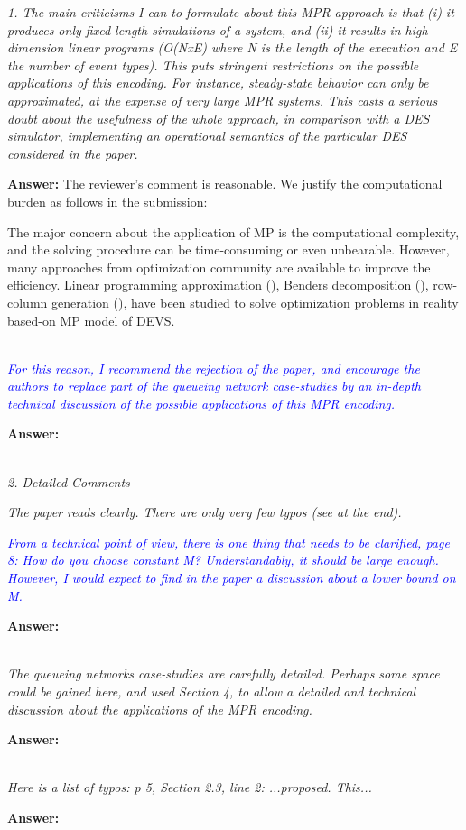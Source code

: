 \documentclass[suppldata]{interact}
\begin{document}
\textit{1. The main criticisms I can to formulate about this MPR approach is that
(i) it produces only fixed-length simulations of a system, and (ii) it
results in high-dimension linear programs (O(NxE) where N is the
length of the execution and E the number of event types). This puts
stringent restrictions on the possible applications of this
encoding. For instance, steady-state behavior can only be
approximated, at the expense of very large MPR systems. This casts a
serious doubt about the usefulness of the whole approach, in
comparison with a DES simulator, implementing an operational
semantics of the particular DES considered in the paper.}

\noindent
\textbf{Answer:} The reviewer's comment is reasonable. We justify the computational burden as follows in the submission:

The major concern about the application of MP is the computational complexity, and the solving procedure can be time-consuming or even unbearable. However, many approaches from optimization community are available to improve the efficiency. Linear programming approximation (\cite{alfieri2012mathematical}), Benders decomposition (\cite{weiss2015buffer}), row-column generation (\cite{alfieri2020time}), have been studied to solve optimization problems in reality based-on MP model of DEVS.

~\\

\textit{\textcolor{blue}{For this reason, I recommend the rejection of the paper, and encourage the authors to replace part of the queueing network case-studies by an in-depth technical discussion of the possible applications of this MPR encoding.}}

\noindent
\textbf{Answer:}

~\\

\textit{2. Detailed Comments}


\textit{The paper reads clearly. There are only very few typos (see at the
end).}

\textit{\textcolor{blue}{From a technical point of view, there is one thing that needs to be clarified, page 8: How do you choose constant M? Understandably, it should be large enough. However, I would expect to find in the paper a discussion about a lower bound on M.}}

\noindent
\textbf{Answer:}


~\\


\textit{The queueing networks case-studies are carefully detailed. Perhaps
some space could be gained here, and used Section 4, to allow a
detailed and technical discussion about the applications of the MPR
encoding.}

\noindent
\textbf{Answer:}


~\\
\textit{Here is a list of typos: p 5, Section 2.3, line 2: ...proposed. This...}

\noindent
\textbf{Answer:}





\end{document}
